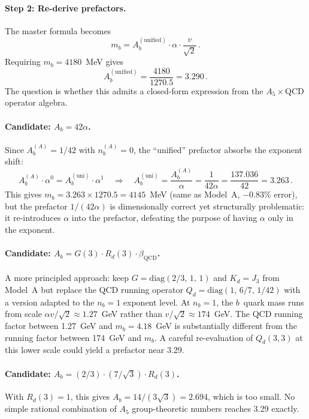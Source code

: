 \documentclass[11pt]{article}
\begin{document}
\paragraph{Step 2: Re-derive prefactors.}
The master formula becomes
\[
  m_b = A_b^{(\text{unified})} \cdot \alpha \cdot \frac{v}{\sqrt{2}}\,.
\]
Requiring $m_b = 4180$~MeV gives
\[
  A_b^{(\text{unified})} = \frac{4180}{1270.5} = 3.290\,.
\]
The question is whether this admits a closed-form expression from the
$A_5 \times \mathrm{QCD}$ operator algebra.

\paragraph{Candidate: $A_b = 42\alpha$.}
Since $A_b^{(A)} = 1/42$ with $n_b^{(A)}=0$, the ``unified'' prefactor
absorbs the exponent shift:
\[
  A_b^{(A)} \cdot \alpha^{0} = A_b^{(\text{uni})} \cdot \alpha^{1}
  \quad\Longrightarrow\quad
  A_b^{(\text{uni})} = \frac{A_b^{(A)}}{\alpha} = \frac{1}{42\alpha}
  = \frac{137.036}{42} = 3.263\,.
\]
This gives $m_b = 3.263 \times 1270.5 = 4145$~MeV (same as Model~A,
$-0.83\%$ error), but the prefactor $1/(42\alpha)$ is dimensionally correct
yet structurally problematic: it re-introduces $\alpha$ into the prefactor,
defeating the purpose of having $\alpha$ only in the exponent.

\paragraph{Candidate: $A_b = G(3)\cdot R_d(3)\cdot \beta_{\text{QCD}}$.}
A more principled approach: keep $G = \mathrm{diag}(2/3,\,1,\,1)$ and
$K_d = J_3$ from Model~A but replace the QCD running operator
$Q_d = \mathrm{diag}(1,\,6/7,\,1/42)$ with a version adapted to the
$n_b=1$ exponent level.  At $n_b=1$, the $b$~quark mass runs from scale
$\alpha v/\sqrt{2} \approx 1.27$~GeV rather than $v/\sqrt{2} \approx
174$~GeV.  The QCD running factor between 1.27~GeV and $m_b = 4.18$~GeV
is substantially different from the running factor between 174~GeV and
$m_b$.  A careful re-evaluation of $Q_d(3,3)$ at this lower scale could
yield a prefactor near 3.29.

\paragraph{Candidate: $A_b = (2/3)\cdot (7/\sqrt{3})\cdot R_d(3)$.}
With $R_d(3)=1$, this gives $A_b = 14/(3\sqrt{3}) = 2.694$, which is
too small.  No simple rational combination of $A_5$ group-theoretic
numbers reaches 3.29 exactly.
\end{document}
